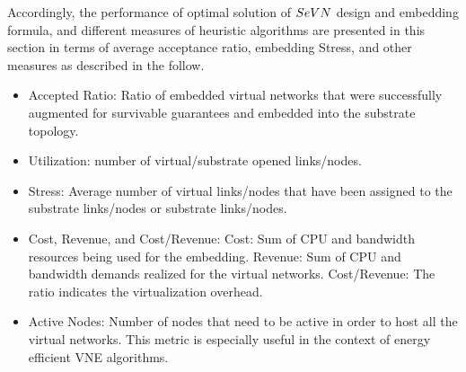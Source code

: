 Accordingly, the performance of optimal solution of $SeVN$ design and embedding formula, and different measures of heuristic algorithms are presented in this section in terms of average acceptance ratio, embedding Stress, and other measures as described in the follow.
\begin{itemize}
  \item Accepted Ratio: Ratio of embedded virtual networks that were successfully augmented for survivable guarantees and embedded into the substrate topology.
  \item Utilization:  number of virtual/substrate opened links/nodes.
  \item Stress: Average number of virtual links/nodes that have been assigned to the substrate links/nodes or  substrate links/nodes.
  \item Cost, Revenue, and Cost/Revenue: Cost: Sum of CPU and bandwidth resources being used for the embedding. Revenue: Sum of CPU and bandwidth demands realized for the virtual networks. Cost/Revenue: The ratio indicates the virtualization overhead.
 \item Active Nodes: Number of nodes that need to be active in order to host all the virtual networks. This metric is especially useful in the context of energy efficient VNE algorithms.
\end{itemize}

